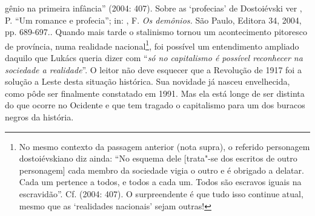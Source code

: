 {{  gênio na primeira infância'' (2004: 407). Sobre as `profecias' de
  Dostoiévski ver , P. ``Um romance e profecia''; in:
  , F. \emph{\emph{Os demônios}.} São Paulo, Editora 34,
  2004, pp. 689-697.}. Quando mais tarde o stalinismo tornou um
acontecimento pitoresco de província, numa realidade nacional\footnote{No
  mesmo contexto da passagem anterior (nota supra), o referido
  personagem dostoiévskiano diz ainda: ``No esquema dele [trata"-se dos
  escritos de outro personagem] cada membro da sociedade vigia o outro
  e é obrigado a delatar. Cada um pertence a todos, e todos a cada um.
  Todos são escravos iguais na escravidão''. Cf.  (2004:
  407). O surpreendente é que tudo isso continue atual, mesmo que as
  `realidades nacionais' sejam outras!}, foi possível um entendimento
ampliado daquilo que Lukács queria dizer com ``\emph{só no capitalismo é
possível reconhecer na sociedade a realidade}''. O leitor não deve
esquecer que a Revolução de 1917 foi a solução a Leste desta situação
histórica. Sua novidade já nasceu envelhecida, como pôde ser finalmente
constatado em 1991. Mas ela está longe de ser distinta do que ocorre no
Ocidente e que tem tragado o capitalismo para um dos buracos negros da
história.

}
